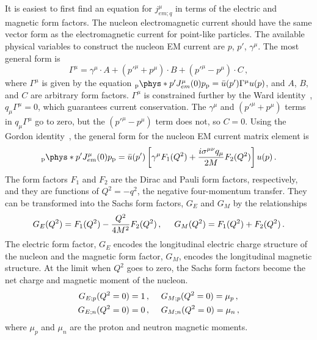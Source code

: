   It is easiest to first find an equation for $j^{\mu}_{em;q}$ in terms of the
  electric and magnetic form factors. The nucleon electromagnetic current
  should have the same vector form as the electromagnetic current for
  point-like particles. The available physical variables to construct the
  nucleon EM current are $p$, $p'$, $\gamma^{\mu}$. The most general form
  is~\cite{Alberico:2001sd}
  \begin{equation}
    \Gamma^{\mu} = \gamma^{\mu}\cdot A + (p'^{\mu} + p^{\mu})\cdot B + (p'^{\mu} - p^{\mu})\cdot C \,,
  \end{equation}
  where $\Gamma^{\mu}$ is given by the equation
  $_{\textrm{p}}\phys*{p'}{J^{\mu}_{em}(0)}{p}_{\textrm{p}} =
  \bar{u}(p')\Gamma^{\mu}u(p)$, and $A$, $B$, and $C$ are arbitrary form
  factors.  $\Gamma^{\mu}$ is constrained further by the Ward
  identity~\cite{Ward:1950xp}, $q_{\mu}\Gamma^{\mu} = 0$, which guarantees
  current conservation. The $\gamma^{\mu}$ and $(p'^{\mu} + p^{\mu})$ terms in
  $q_{\mu}\Gamma^{\mu}$ go to zero, but the $(p'^{\mu} - p^{\mu})$ term does
  not, so $C=0$. Using the Gordon identity~\cite{Gordon:1928}, the general form
  for the nucleon EM current matrix element is
  \begin{equation}\label{eq:FFem}
    _{\textrm{p}}\phys*{p'}{J^{\mu}_{em}(0)}{p}_{\textrm{p}} =
      \bar{u}(p')\left[ \gamma^{\mu}F_1(Q^2) + \frac{i\sigma^{\mu\nu}q_{\mu}}{2M}F_2(Q^2)  \right]u(p) \,.
  \end{equation}
  The form factors $F_1$ and $F_2$ are the Dirac and Pauli form factors,
  respectively, and they are functions of $Q^2 = -q^2$, the negative
  four-momentum transfer. They can be transformed into the Sachs form factors,
  $G_E$ and $G_M$ by the relationships
  \begin{equation}
    G_E(Q^2) = F_1(Q^2) - \frac{Q^2}{4M^2}F_2(Q^2)\,, \hspace{5mm} G_M(Q^2) = F_1(Q^2) + F_2(Q^2) \,.
  \end{equation}
  The electric form factor, $G_E$ encodes the longitudinal electric charge
  structure of the nucleon and the magnetic form factor, $G_M$, encodes the
  longitudinal magnetic structure. At the limit when $Q^2$ goes to zero, the
  Sachs form factors become the net charge and magnetic moment of the nucleon.
  \begin{equation}
    \begin{aligned}
      G_{E;p}(Q^2=0) = 1 \,,& \hspace{5mm} G_{M;p}(Q^2=0) = \mu_p \,, \\
      G_{E;n}(Q^2=0) = 0 \,,& \hspace{5mm} G_{M;n}(Q^2=0) = \mu_n \,,
    \end{aligned}
  \end{equation}
  where $\mu_p$ and $\mu_n$ are the proton and neutron magnetic moments.
 
